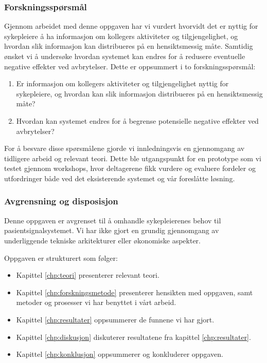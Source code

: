 \subsubsection{Forskningsspørsmål}
Gjennom arbeidet med denne oppgaven har vi vurdert hvorvidt det er nyttig for sykepleiere å ha informasjon om kollegers aktiviteter og tilgjengelighet, og hvordan slik informasjon kan distribueres på en hensiktsmessig måte. Samtidig ønsket vi å undersøke hvordan systemet kan endres for å redusere eventuelle negative effekter ved avbrytelser. Dette er oppsummert i to forskningsspørsmål:

\begin{enumerate}
\item Er informasjon om kollegers aktiviteter og tilgjengelighet nyttig for sykepleiere, og hvordan kan slik informasjon distribueres på en hensiktsmessig måte? 
\item Hvordan kan systemet endres for å begrense potensielle negative effekter ved avbrytelser?
\end{enumerate}

\noindent
For å besvare disse spørsmålene gjorde vi innledningsvis en gjennomgang av tidligere arbeid og relevant teori. Dette ble utgangspunkt for en prototype som vi testet gjennom workshops, hvor deltagerene fikk vurdere og evaluere fordeler og utfordringer både ved det eksisterende systemet og vår foreslåtte løsning. 

\subsubsection{Avgrensning og disposisjon}
Denne oppgaven er avgrenset til å omhandle sykepleierenes behov til pasientsignalsystemet. Vi har ikke gjort en grundig gjennomgang av underliggende tekniske arkitekturer eller økonomiske aspekter.

\noindent
Oppgaven er strukturert som følger:
\begin{itemize}
\item Kapittel \ref{chp:teori} presenterer relevant teori.
\item Kapittel \ref{chp:forskningsmetode} presenterer hensikten med oppgaven, samt metoder og prosesser vi har benyttet i vårt arbeid. 
\item Kapittel \ref{chp:resultater} oppsummerer de funnene vi har gjort.
\item Kapittel \ref{chp:diskusjon} diskuterer resultatene fra kapittel \ref{chp:resultater}.
\item Kapittel \ref{chp:konklusjon} oppsummerer og konkluderer oppgaven.
\end{itemize}
